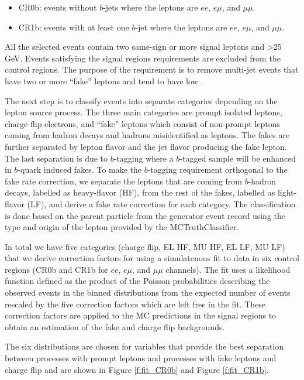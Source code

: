 \begin{itemize}
\item CR0b: events without $b$-jets where the leptons are $ee$, $e\mu$, and $\mu\mu$.
\item CR1b: events with at least one $b$-jet where the leptons are $ee$, $e\mu$, and $\mu\mu$.
\end{itemize}

All the selected events contain two same-sign or more signal leptons and \met >25 GeV. 
Events satisfying the signal regions requirements are excluded from the control regions. 
The purpose of the \met requirement is to remove multi-jet events that have two or more ``fake'' leptons and tend to have low \met. 

The next step is to classify events into separate categories depending on the lepton source process. 
The three main categories are prompt isolated leptons, charge flip electrons, 
and ``fake'' leptons which consist of non-prompt leptons coming from hadron decays and hadrons misidentified as leptons. 
The fakes are further separated by lepton flavor and the jet flavor producing the fake lepton. 
The last separation is due to $b$-tagging where a $b$-tagged sample will be enhanced in $b$-quark induced fakes. 
To make the $b$-tagging requirement orthogonal to the fake rate correction, we separate the leptons that are coming from $b$-hadron decays, 
labelled as heavy-flavor (HF), from the rest of the fakes, labelled as light-flavor (LF), and derive a fake rate correction for each category.
The classification is done based on the parent particle from the generator event record using the type and origin of the lepton provided by the MCTruthClassifier.

In total we have five categories (charge flip, EL HF, MU HF, EL LF, MU LF) that we derive correction factors for using a simulatenous fit to data in six control regions (CR0b and CR1b for $ee$, $e\mu$, and $\mu\mu$ channels).
The fit uses a likelihood function defined as the product of the Poisson probabilities describing the observed events in the binned distributions from the expected number 
of events rescaled by the five correction factors which are left free in the fit.  
These correction factors are applied to the MC predictions in the signal regions to obtain an estimation of the fake and charge flip backgrounds. 

The six distributions are chosen for variables that provide the best separation between processes with prompt leptons and processes with fake leptons and charge flip and are shown in 
Figure \ref{f:fit_CR0b} and Figure \ref{f:fit_CR1b}. 

